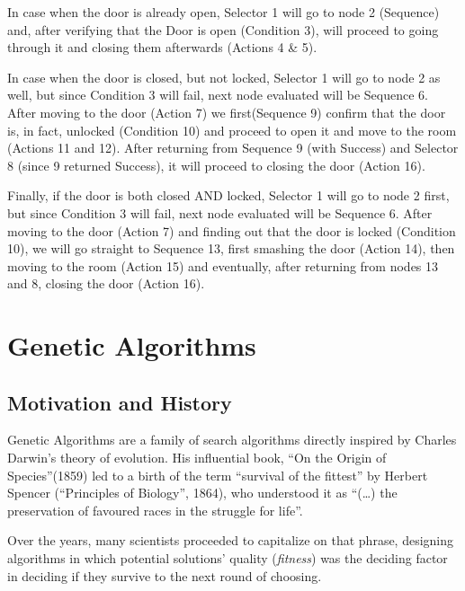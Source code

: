 In case when the door is already open, Selector 1 will go to node 2 (Sequence) and, after verifying that the Door is open (Condition 3), will proceed to going through it and closing them afterwards (Actions 4 \& 5).

In case when the door is closed, but not locked, Selector 1 will go to node 2 as well, but since Condition 3 will fail, next node evaluated will be Sequence 6. After moving to the door (Action 7) we first(Sequence 9) confirm that the door is, in fact, unlocked (Condition 10) and proceed to open it and move to the room (Actions 11 and 12). After returning from Sequence 9 (with Success) and Selector 8 (since 9 returned Success), it will proceed to closing the door (Action 16).

Finally, if the door is both closed AND locked, Selector 1 will go to node 2 first, but since Condition 3 will fail, next node evaluated will be Sequence 6. After moving to the door (Action 7) and finding out that the door is locked (Condition 10), we will go straight to Sequence 13, first smashing the door (Action 14), then moving to the room (Action 15) and eventually, after returning from nodes 13 and 8, closing the door (Action 16).
\section{Genetic Algorithms}
\subsection{Motivation and History}
Genetic Algorithms are a family of search algorithms directly inspired by Charles Darwin's theory of evolution. His influential book, ``On the Origin of Species''(1859) led to a birth of the term ``survival of the fittest'' by Herbert Spencer (``Principles of Biology'', 1864), who understood it as \enquote{(\ldots) the preservation of favoured races in the struggle for life}.

Over the years, many scientists proceeded to capitalize on that phrase, designing algorithms in which potential solutions' quality (\textit{fitness}) was the deciding factor in deciding if they survive to the next round of choosing. %

